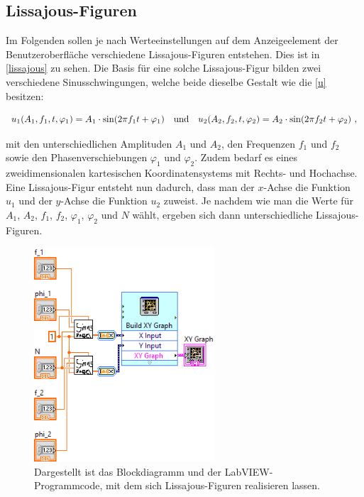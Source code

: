\documentclass[
a4paper,
12pt,
pagesize,
ngerman
]{scrartcl}
\begin{document}
	\subsection{Lissajous-Figuren}
	
	Im Folgenden sollen je nach Werteeinstellungen auf dem Anzeigeelement der Benutzeroberfläche verschiedene Lissajous-Figuren entstehen. Dies ist in \cref{lissajous} zu sehen. Die Basis für eine solche Lissajous-Figur bilden zwei verschiedene Sinusschwingungen, welche beide dieselbe Gestalt wie die \cref{u} besitzen:
	
	\begin{equation} \label{u1u2}
	u_1(A_1,f_1,t,\varphi_1) = A_1 \cdot \sin(2\pi f_1 t + \varphi_1) \ \ \ \textnormal{und} \ \ \ u_2(A_2,f_2,t,\varphi_2) = A_2 \cdot \sin(2\pi f_2 t + \varphi_2) \ ,
	\end{equation}
	
	\noindent mit den unterschiedlichen Amplituden $A_1$ und $A_2$, den Frequenzen $f_1$ und $f_2$ sowie den Phasenverschiebungen $\varphi_1$ und $\varphi_2$. Zudem bedarf es eines zweidimensionalen kartesischen Koordinatensystems mit Rechts- und Hochachse. Eine Lissajous-Figur entsteht nun dadurch, dass man der $x$-Achse die Funktion $u_1$ und der $y$-Achse die Funktion $u_2$ zuweist. Je nachdem wie man die Werte für $A_1$, $A_2$, $f_1$, $f_2$, $\varphi_1$, $\varphi_2$ und $N$ wählt, ergeben sich dann unterschiedliche Lissajous-Figuren.
	
	\begin{figure}[H]
		\centering
		\includegraphics[width=0.6\textwidth]{EIRE2018Dateien/Tag1/lissajous-bilder/Lissajousd} %
		\caption{Dargestellt ist das Blockdiagramm und der LabVIEW-Programmcode, mit dem sich Lissajous-Figuren realisieren lassen.}
		\label{lissajousprogrammcode}
	\end{figure}
\end{document}

